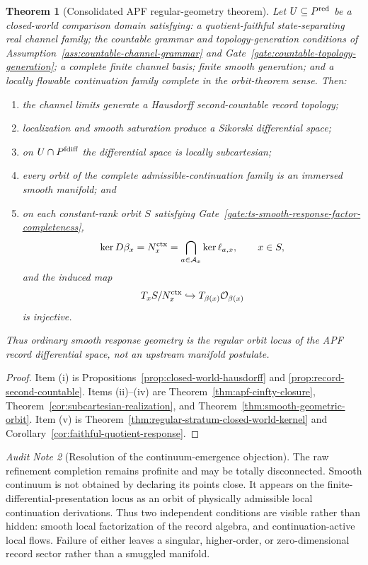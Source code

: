 \documentclass[11pt]{article}
\newtheorem{theorem}{Theorem}[section]
\theoremstyle{remark}
\newtheorem{audit}[theorem]{Audit Note}
\begin{document}
\begin{theorem}[Consolidated APF regular-geometry theorem]
\label{thm:consolidated-regular-geometry}
Let $U\subseteq P^{\rm red}$ be a closed-world comparison domain satisfying:
a quotient-faithful state-separating real channel family; the countable grammar
and topology-generation conditions of
Assumption~\ref{ass:countable-channel-grammar} and
Gate~\ref{gate:countable-topology-generation}; a complete finite channel basis;
finite smooth generation; and a locally flowable continuation family complete
in the orbit-theorem sense.  Then:
\begin{enumerate}[label=(\roman*)]
\item the channel limits generate a Hausdorff second-countable record topology;
\item localization and smooth saturation produce a Sikorski differential space;
\item on $U\cap P^{\rm fdiff}$ the differential space is locally subcartesian;
\item every orbit of the complete admissible-continuation family is an immersed
smooth manifold; and
\item on each constant-rank orbit $S$ satisfying
Gate~\ref{gate:ts-smooth-response-factor-completeness},
\[
\ker D\beta_x
=N_x^{\rm ctx}
=\bigcap_{a\in\mathcal A_x}\ker\ell_{a,x},
\qquad x\in S,
\]
and the induced map
\[
T_xS/N_x^{\rm ctx}\hookrightarrow T_{\beta(x)}\mathcal O_{\beta(x)}
\]
is injective.
\end{enumerate}
Thus ordinary smooth response geometry is the regular orbit locus of the APF
record differential space, not an upstream manifold postulate.
\end{theorem}

\begin{proof}
Item (i) is Propositions~\ref{prop:closed-world-hausdorff} and
\ref{prop:record-second-countable}.  Items (ii)--(iv) are
Theorem~\ref{thm:apf-cinfty-closure},
Theorem~\ref{cor:subcartesian-realization}, and
Theorem~\ref{thm:smooth-geometric-orbit}.  Item (v) is
Theorem~\ref{thm:regular-stratum-closed-world-kernel} and
Corollary~\ref{cor:faithful-quotient-response}.
\end{proof}

\begin{audit}[Resolution of the continuum-emergence objection]
The raw refinement completion remains profinite and may be totally
disconnected.  Smooth continuum is not obtained by declaring its points
close.  It appears on the finite-differential-presentation locus as an orbit of
physically admissible local continuation derivations.  Thus two independent
conditions are visible rather than hidden: smooth local factorization of the
record algebra, and continuation-active local flows.  Failure of either leaves
a singular, higher-order, or zero-dimensional record sector rather than a
smuggled manifold.
\end{audit}
\end{document}
